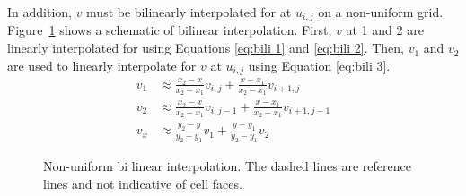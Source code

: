 In addition, $v$ must be bilinearly interpolated for at $u_{i,j}$ on a non-uniform grid.
Figure~\ref{fig:bi-linear-interpolation} shows a schematic of bilinear interpolation.
First, $v$ at 1 and 2 are linearly interpolated for using Equations \eqref{eq:bili 1} and \eqref{eq:bili 2}. 
Then, $v_1$ and $v_2$ are used to linearly interpolate for $v$ at $u_{i,j}$ using Equation \eqref{eq:bili 3}.
\begin{align}
v_1 &\approx \frac{x_2 - x}{x_2 - x_1}v_{i,j} + \frac{x - x_1}{x_2 - x_1}v_{i+1,j} \label{eq:bili 1} \\
v_2 &\approx \frac{x_2 - x}{x_2 - x_1}v_{i,j-1} + \frac{x - x_1}{x_2 - x_1}v_{i+1,j-1} \label{eq:bili 2} \\
v_x &\approx \frac{y_2 - y}{y_2 - y_1}v_{1} + \frac{y - y_1}{y_2 - y_1}v_{2} \; \label{eq:bili 3}
\end{align}
\begin{figure}[!htb]
	\centering
	
	\caption{Non-uniform bi linear interpolation. The dashed lines are reference lines and not indicative of cell faces.}
	\label{fig:bi-linear-interpolation}
\end{figure}

